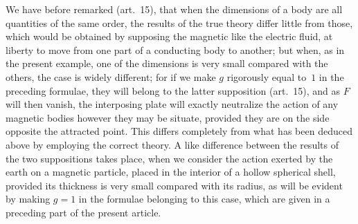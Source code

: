\documentclass[11pt,notitlepage]{amsart}
\begin{document}
We have before remarked (art.~15), that when the dimensions of a
body are all quantities of the same order, the results of the true theory differ
little from those, which would be obtained by supposing the magnetic like the
electric fluid,
at liberty to move from one part of a conducting body to another;
but when, as in the present example, one of the dimensions is very small
compared with the others, the case is widely different; for if we make $g$
rigorously equal to~$1$ in the preceding formulae,
they will belong to the latter
supposition (art.~15), and as $F$ will then vanish, the interposing plate will
exactly neutralize the action of any magnetic bodies however they may be
situate, provided they are on the side opposite the attracted point.
This differs
completely from what has been deduced above by employing the correct
theory. A like difference between the results of the two suppositions takes
place, when we consider the action exerted by the earth on a magnetic
particle, placed in the interior of a hollow spherical shell, provided its
thickness is very small compared with its radius, as will be evident by making
$g=1$ in the formulae belonging to this case, which are given in a preceding
part of the present article.
\bigskip
\end{document}
